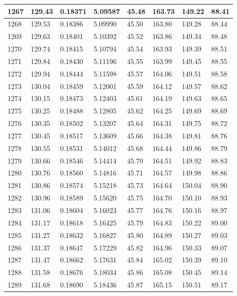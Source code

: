 \documentclass[12pt,a4paper,twoside]{article}
\begin{document}
\begin{center}
\begin{longtable}{l l l l | l l l l}
1267 & 129.43 & 0.18371 & 5.09587 & 45.48 & 163.73 & 149.22 & 88.41 \\ \hline
1268 & 129.53 & 0.18386 & 5.09990 & 45.50 & 163.80 & 149.28 & 88.44 \\ \hline
1269 & 129.63 & 0.18401 & 5.10392 & 45.52 & 163.86 & 149.34 & 88.48 \\ \hline
1270 & 129.74 & 0.18415 & 5.10794 & 45.54 & 163.93 & 149.39 & 88.51 \\ \hline
1271 & 129.84 & 0.18430 & 5.11196 & 45.55 & 163.99 & 149.45 & 88.55 \\ \hline
1272 & 129.94 & 0.18444 & 5.11598 & 45.57 & 164.06 & 149.51 & 88.58 \\ \hline
1273 & 130.04 & 0.18459 & 5.12001 & 45.59 & 164.12 & 149.57 & 88.62 \\ \hline
1274 & 130.15 & 0.18473 & 5.12403 & 45.61 & 164.19 & 149.63 & 88.65 \\ \hline
1275 & 130.25 & 0.18488 & 5.12805 & 45.62 & 164.25 & 149.69 & 88.69 \\ \hline
1276 & 130.35 & 0.18502 & 5.13207 & 45.64 & 164.31 & 149.75 & 88.72 \\ \hline
1277 & 130.45 & 0.18517 & 5.13609 & 45.66 & 164.38 & 149.81 & 88.76 \\ \hline
1278 & 130.55 & 0.18531 & 5.14012 & 45.68 & 164.44 & 149.86 & 88.79 \\ \hline
1279 & 130.66 & 0.18546 & 5.14414 & 45.70 & 164.51 & 149.92 & 88.83 \\ \hline
1280 & 130.76 & 0.18560 & 5.14816 & 45.71 & 164.57 & 149.98 & 88.86 \\ \hline
1281 & 130.86 & 0.18574 & 5.15218 & 45.73 & 164.64 & 150.04 & 88.90 \\ \hline
1282 & 130.96 & 0.18589 & 5.15620 & 45.75 & 164.70 & 150.10 & 88.93 \\ \hline
1283 & 131.06 & 0.18604 & 5.16023 & 45.77 & 164.76 & 150.16 & 88.97 \\ \hline
1284 & 131.17 & 0.18618 & 5.16425 & 45.79 & 164.83 & 150.22 & 89.00 \\ \hline
1285 & 131.27 & 0.18632 & 5.16827 & 45.80 & 164.89 & 150.27 & 89.03 \\ \hline
1286 & 131.37 & 0.18647 & 5.17229 & 45.82 & 164.96 & 150.33 & 89.07 \\ \hline
1287 & 131.47 & 0.18662 & 5.17631 & 45.84 & 165.02 & 150.39 & 89.10 \\ \hline
1288 & 131.58 & 0.18676 & 5.18034 & 45.86 & 165.08 & 150.45 & 89.14 \\ \hline
1289 & 131.68 & 0.18690 & 5.18436 & 45.87 & 165.15 & 150.51 & 89.17 \\ \hline

\end{longtable}
\end{center}
\end{document}
